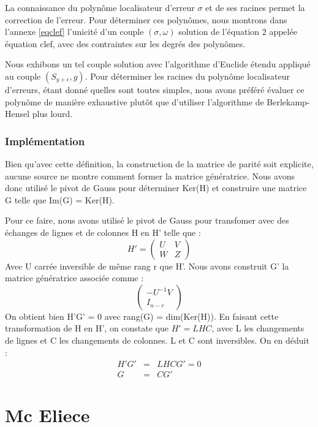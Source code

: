 \documentclass{article}
\begin{document}
			La connaissance du polynôme localisateur d'erreur $\sigma$ et de ses racines permet la correction de l'erreur.
			Pour déterminer ces polynômes, nous montrons dans l'annexe \ref{eqclef} l'unicité d'un couple $ (\sigma,\omega) $ solution de l'équation 2 appelée équation clef, avec des contraintes sur les degrés des polynômes.

			Nous exhibons un tel couple solution avec l'algorithme d'Euclide étendu appliqué au couple $ (S_{y+\epsilon},g) $.
			Pour déterminer les racines du polynôme localisateur d'erreurs, étant donné quelles sont toutes simples, nous avons préféré évaluer ce polynôme de manière exhaustive plutôt que d'utiliser l'algorithme de Berlekamp-Hensel plus lourd.

		\section*{Implémentation}

			Bien qu'avec cette définition, la construction de la matrice de parité soit explicite, aucune source ne montre comment former la matrice génératrice.
			Nous avons donc utilisé le pivot de Gauss pour déterminer Ker(H) et construire une matrice G telle que Im(G) = Ker(H).

			Pour ce faire, nous avons utilisé le pivot de Gauss pour transfomer avec des échanges de lignes et de colonnes H en H' telle que :
			$$ H' = 
			\begin{pmatrix}
				U & V \\
				W & Z
			\end{pmatrix}
			$$
			Avec U carrée inversible de même rang r que H'.
			Nous avons construit G' la matrice génératrice associée comme :
			$$
			\begin{pmatrix}
				-U^{-1}V \\
				I_{n-r}
			\end{pmatrix}
			$$
			On obtient bien H'G' = 0 avec rang(G) = dim(Ker(H)).
			En faisant cette transformation de H en H', on constate que $H' = LHC$, avec L les changements de lignes et C les changements de colonnes.
			L et C sont inversibles.
			On en déduit :
			\begin{eqnarray*}
				H'G' &=& LHCG' = 0\\
				G &=& CG'
			\end{eqnarray*}


	\part*{Mc Eliece}
\end{document}
